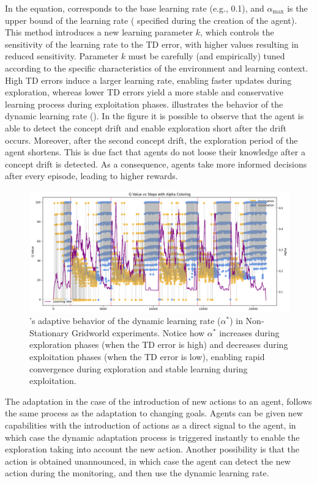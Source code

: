 In the equation, \lrate{\alpha} corresponds to the base learning rate (e.g., 0.1), and $\alpha_{\max}$ 
is the upper bound of the learning rate ( specified during the creation of the agent). This 
method introduces a new learning parameter $k$, which controls the sensitivity of the learning rate to 
the TD error, with higher values resulting in reduced sensitivity. Parameter $k$ must be carefully (and 
empirically) tuned according to the specific characteristics of the environment and learning context. 
High TD errors induce a larger learning rate, enabling faster updates during exploration, whereas 
lower TD errors yield a more stable and conservative learning process during exploitation phases. 
 illustrates the behavior of the dynamic learning rate (\lrate{\alpha^*}). In the figure it 
is possible to observe that the agent is able to detect the concept drift and enable exploration short 
after the drift occurs. Moreover, after the second concept drift, the exploration period of the agent 
shortens. This is due fact that agents do not loose their knowledge after a concept drift is detected. 
As a consequence, agents take more informed decisions after every episode, leading to higher 
rewards. 

\begin{figure}[htptb]
    \centering
    \includegraphics[width=\textwidth]{figures/alpha.png}
    \caption{\adaptiverl's adaptive behavior of the dynamic learning rate ($\alpha^*$) in Non-Stationary Gridworld experiments. Notice how $\alpha^*$ increases during exploration phases (when the TD error is high) and decreases during exploitation phases (when the TD error is low), enabling rapid convergence during exploration and stable learning during exploitation.}
    \label{fig:alpha}
\end{figure}

The adaptation in the case of the introduction of new actions to an agent, follows the same process 
as the adaptation to changing goals. Agents can be given new capabilities with the introduction of 
actions as a direct signal to the agent, in which case the dynamic adaptation process is triggered 
instantly to enable the exploration taking into account the new action. Another possibility is that the 
action is obtained unannounced, in which case the agent can detect the new action during the 
monitoring, and then use the dynamic learning rate.

